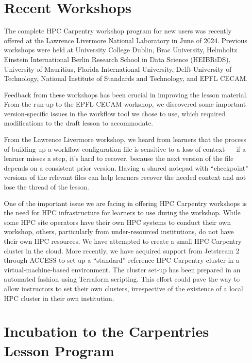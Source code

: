 \section{Recent Workshops}

The complete HPC Carpentry workshop program for new users was recently offered at the Lawrence Livermore National Laboratory in June of 2024.
Previous workshops were held at University College Dublin, Brac University, Helmholtz Einstein International Berlin Research School in Data Science (HEIBRiDS), University of Mauritius, Florida International University, Delft University of Technology, National Institute of Standards and Technology, and EPFL CECAM.

Feedback from these workshops has been crucial in improving the lesson material. From the run-up to the EPFL CECAM workshop, we discovered some important version-specific issues in the workflow tool we chose to use, which required modifications to the draft lesson to accommodate. 

From the Lawrence Livermore workshop, we heard from learners that the process of building up a workflow configuration file is sensitive to a loss of context --- if a learner misses a step, it's hard to recover, because the next version of the file depends on a consistent prior version. Having a shared notepad with ``checkpoint'' versions of the relevant files can help learners recover the needed context and not lose the thread of the lesson. 

One of the important issue we are facing in offering HPC Carpentry workshops is the need for HPC infrastructure for learners to use during the workshop.
While some HPC site operators have their own HPC systems to conduct their own workshop, others, particularly from under-resourced institutions, do not have their own HPC resources.
We have attempted to create a small HPC Carpentry cluster in the cloud.
More recently, we have acquired support from Jetstream 2 through ACCESS to set up a ``standard'' reference HPC Carpentry cluster in a virtual-machine-based environment.
The cluster set-up has been prepared in an automated fashion using Terraform scripting.
This effort could pave the way to allow instructors to set their own clusters, irrespective of the existence of a local HPC cluster in their own institution.


\section{Incubation to the Carpentries Lesson Program}

